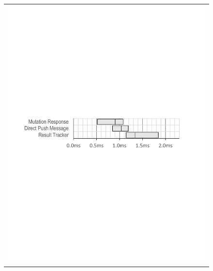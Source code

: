 \begin{figure}
\begin{tabular}{c}
\includegraphics[width=\columnwidth, viewport=54 354 530 444]{figs/push-latencies}\\[.2in]

\end{tabular}
\end{figure}
